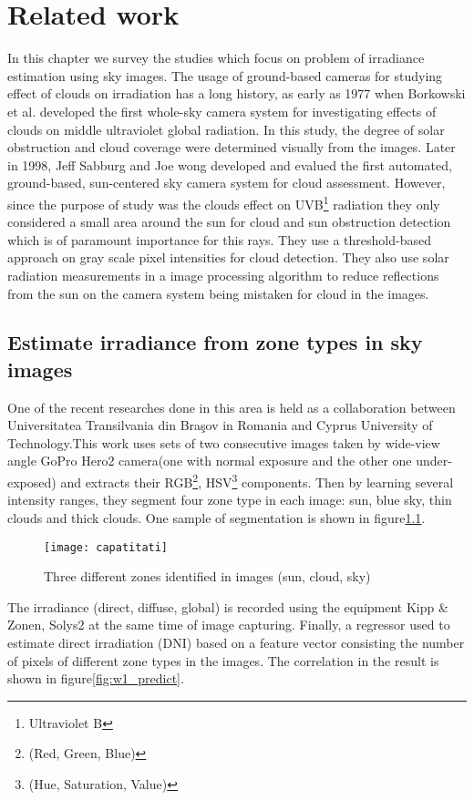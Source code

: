 \chapter{Related work}
In this chapter we survey the studies which focus on problem of irradiance estimation using sky images. The usage of ground-based cameras for studying effect of clouds on irradiation has a long history, as early as 1977 when Borkowski et al.\cite{Borkowski1977} developed the first whole-sky camera system for investigating effects of clouds on middle ultraviolet global radiation. In this study, the degree of solar obstruction and cloud coverage were determined visually from the images. Later in 1998, Jeff Sabburg and Joe wong\cite{Sabburg1998} developed and evalued the first automated, ground-based, sun-centered sky camera system for cloud assessment. However, since the purpose of study was the clouds effect on UVB\footnote{Ultraviolet B} radiation they only considered a small area around the sun for cloud and sun obstruction detection which is of paramount importance for this rays. They use a threshold-based approach on gray scale pixel intensities for cloud detection. They also use solar radiation measurements in a image processing algorithm to reduce reflections from the sun on the camera system being mistaken for cloud in the images.

\section{Estimate irradiance from zone types in sky images}
One of the recent researches done in this area is held as a collaboration between Universitatea Transilvania din Braşov in Romania and Cyprus University of Technology\cite{romania_paper}\cite{romania_report}.This work uses sets of two consecutive images taken by wide-view angle GoPro Hero2 camera(one with normal exposure and the other one under-exposed) and extracts their RGB\footnote{(Red, Green, Blue)}, HSV\footnote{(Hue, Saturation, Value)} components. Then by learning several intensity ranges, they segment four zone type in each image: sun, blue sky, thin clouds and thick clouds. One sample of segmentation is shown in figure\ref{fig:capatitati}.

\begin{figure}[h]
\caption{Three different zones identified in images (sun, cloud, sky)}
\label{fig:capatitati}
\texttt{[image: capatitati]}
\centering
\end{figure} 

 The irradiance (direct, diffuse, global) is recorded using the equipment Kipp \& Zonen, Solys2 at the same time of image capturing. Finally, a regressor used to estimate direct irradiation (DNI) based on a feature vector consisting the number of pixels of different zone types in the images. The correlation in the result is shown in figure\ref{fig:w1_predict}.

